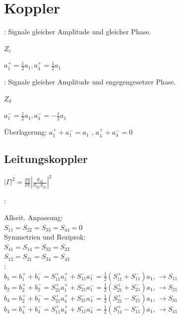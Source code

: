 
\section{Koppler}
\renewcommand{\ort}{topics/Koppler}

\begin{pitemize}
    \item {}: \cp
Signale gleicher Amplitude und gleicher Phase.
\begin{pitemize}
    \item $Z_e$
    \item $a_1^+ = \frac{1}{2} a_1,a_4^+ = \frac{1}{2} a_1$
\end{pitemize}
    \item {}: \cm
Signale gleicher Amplitude und engegengesetzer Phase.
\begin{pitemize}
    \item $Z_d$
    \item $a_1^- = \frac{1}{2} a_1,a_4^- = -\frac{1}{2} a_1$
\end{pitemize}
    \item Überlagerung: $a_1^+  + a_1^- = a_1$ , $a_4^+  + a_4^- = 0$
\end{pitemize}


\subsection{Leitungskoppler}



$|\Gamma|^2 = \frac{P2}{P1} \left\lvert\frac{S_{41}}{S_{32}S_{21}}\right\rvert^2$

:


Allseit. Anpassung: \\$S_{11}=S_{22}=S_{33}=S_{44}=0$\\
Symmetrien und Reziprok:\\
$S_{41}=S_{14}=S_{32}=S_{23}$\\
$S_{12}=S_{21}=S_{34}=S_{43}$\\

:\\
$b_1= b_1^+ + b_1^- = S_{11}^+ a_1^+ + S_{11}^- a_1^- = \frac{1}{2} (S_{11}^+ + S_{11}^-) a_1$, $\rightarrow S_{11}$
$b_2= b_2^+ + b_2^- = S_{21}^+ a_1^+ + S_{21}^- a_1^- = \frac{1}{2} (S_{21}^+ + S_{21}^-) a_1$, $\rightarrow S_{21}$
$b_3= b_2^+ + b_2^- = S_{21}^+ a_4^+ + S_{21}^- a_4^- = \frac{1}{2} (S_{21}^+ - S_{21}^-) a_1$, $\rightarrow S_{31}$
$b_4= b_4^+ + b_4^- = S_{11}^+ a_4^+ + S_{11}^- a_4^- = \frac{1}{2} (S_{11}^+ - S_{11}^-) a_1$, $\rightarrow S_{41}$




